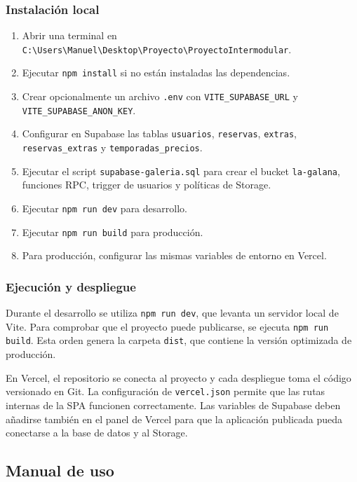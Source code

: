 \documentclass[11pt,a4paper]{article}
\begin{document}
\subsubsection{Instalación local}
\begin{enumerate}[leftmargin=1.4cm]
  \item Abrir una terminal en \texttt{C:\textbackslash Users\textbackslash Manuel\textbackslash Desktop\textbackslash Proyecto\textbackslash ProyectoIntermodular}.
  \item Ejecutar \texttt{npm install} si no están instaladas las dependencias.
  \item Crear opcionalmente un archivo \texttt{.env} con \texttt{VITE\_SUPABASE\_URL} y \texttt{VITE\_SUPABASE\_ANON\_KEY}.
  \item Configurar en Supabase las tablas \texttt{usuarios}, \texttt{reservas}, \texttt{extras}, \texttt{reservas\_extras} y \texttt{temporadas\_precios}.
  \item Ejecutar el script \texttt{supabase-galeria.sql} para crear el bucket \texttt{la-galana}, funciones RPC, trigger de usuarios y políticas de Storage.
  \item Ejecutar \texttt{npm run dev} para desarrollo.
  \item Ejecutar \texttt{npm run build} para producción.
  \item Para producción, configurar las mismas variables de entorno en Vercel.
\end{enumerate}

\subsubsection{Ejecución y despliegue}
Durante el desarrollo se utiliza \texttt{npm run dev}, que levanta un servidor local de Vite. Para comprobar que el proyecto puede publicarse, se ejecuta \texttt{npm run build}. Esta orden genera la carpeta \texttt{dist}, que contiene la versión optimizada de producción.

En Vercel, el repositorio se conecta al proyecto y cada despliegue toma el código versionado en Git. La configuración de \texttt{vercel.json} permite que las rutas internas de la SPA funcionen correctamente. Las variables de Supabase deben añadirse también en el panel de Vercel para que la aplicación publicada pueda conectarse a la base de datos y al Storage.

\subsection{Manual de uso}
\end{document}

